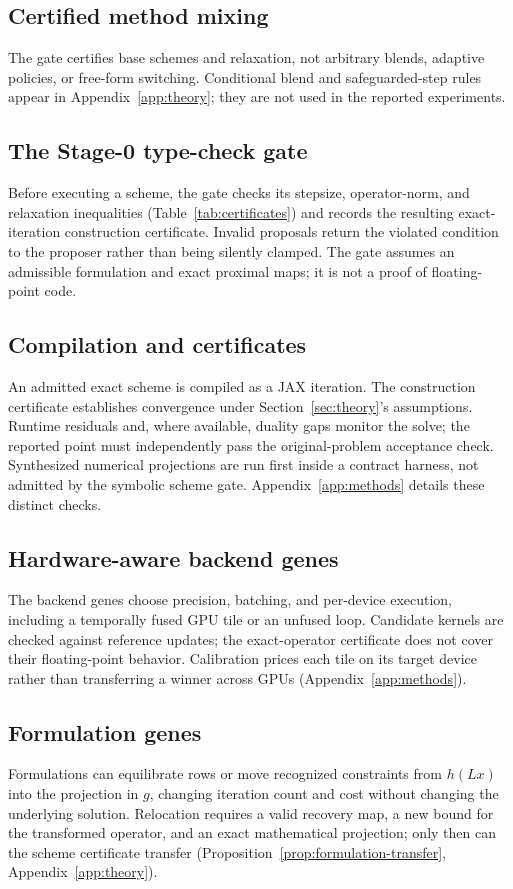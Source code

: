 \subsection{Certified method mixing}
\label{sec:mixing}
The gate certifies base schemes and relaxation, not arbitrary blends, adaptive policies, or free-form switching. Conditional blend and safeguarded-step rules appear in Appendix~\ref{app:theory}; they are not used in the reported experiments.

\subsection{The Stage-0 type-check gate}
\label{sec:gate}
Before executing a scheme, the gate checks its stepsize, operator-norm, and relaxation inequalities (Table~\ref{tab:certificates}) and records the resulting exact-iteration construction certificate. Invalid proposals return the violated condition to the proposer rather than being silently clamped. The gate assumes an admissible formulation and exact proximal maps; it is not a proof of floating-point code.

\subsection{Compilation and certificates}
An admitted exact scheme is compiled as a JAX iteration. The construction certificate establishes convergence under Section~\ref{sec:theory}'s assumptions. Runtime residuals and, where available, duality gaps monitor the solve; the reported point must independently pass the original-problem acceptance check. Synthesized numerical projections are run first inside a contract harness, not admitted by the symbolic scheme gate. Appendix~\ref{app:methods} details these distinct checks.

\subsection{Hardware-aware backend genes}
\label{sec:hardware}
The backend genes choose precision, batching, and per-device execution, including a temporally fused GPU tile or an unfused loop. Candidate kernels are checked against reference updates; the exact-operator certificate does not cover their floating-point behavior. Calibration prices each tile on its target device rather than transferring a winner across GPUs (Appendix~\ref{app:methods}).

\subsection{Formulation genes}
\label{sec:formulation}
Formulations can equilibrate rows or move recognized constraints from $h(Lx)$ into the projection in $g$, changing iteration count and cost without changing the underlying solution. Relocation requires a valid recovery map, a new bound for the transformed operator, and an exact mathematical projection; only then can the scheme certificate transfer (Proposition~\ref{prop:formulation-transfer}, Appendix~\ref{app:theory}).

